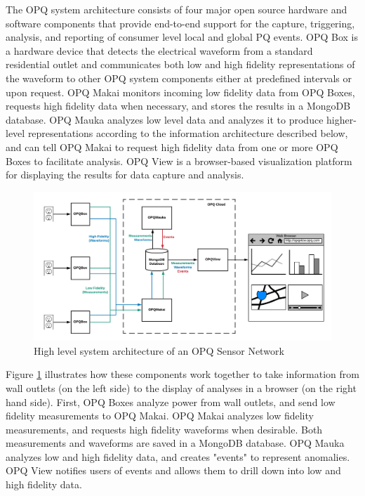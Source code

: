 The OPQ system architecture consists of four major open source hardware and software components that provide end-to-end support for the capture, triggering, analysis, and reporting of consumer level local and global PQ events.  OPQ Box is a hardware device that detects the electrical waveform from a standard residential outlet and communicates both low and high fidelity representations of the waveform to other OPQ system components either at predefined intervals or upon request. OPQ Makai monitors incoming low fidelity data from OPQ Boxes, requests high fidelity data when necessary, and stores the results in a MongoDB database. OPQ Mauka analyzes low level data and analyzes it to produce higher-level representations according to the information architecture described below, and can tell OPQ Makai to request high fidelity data from one or more OPQ Boxes to facilitate analysis. OPQ View is a browser-based visualization platform for displaying the results for data capture and analysis.

\begin{figure}
\center \includegraphics[width=5in]{images/architecture/system-diagram.png}
\caption{High level system architecture of an OPQ Sensor Network}
\label{fig:architecture}
\end{figure}

Figure \ref{fig:architecture} illustrates how these components work together to take information from wall outlets (on the left side) to the display of analyses in a browser (on the right hand side).  First, OPQ Boxes analyze power from wall outlets, and send low fidelity measurements to OPQ Makai. OPQ Makai analyzes low fidelity measurements, and requests high fidelity waveforms when desirable. Both measurements and waveforms are saved in a MongoDB database. OPQ Mauka analyzes low and high fidelity data, and creates "events" to represent anomalies. OPQ View notifies users of events and allows them to drill down into low and high fidelity data.

